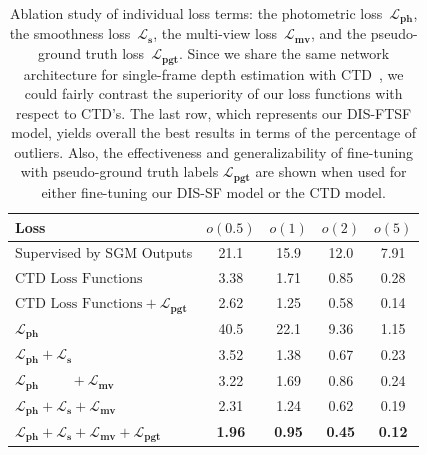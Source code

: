 \begin{table}[t]
    \begin{center}
        \begin{tabular}{lcccc}
        \hline
        Loss & $o(0.5)$ & $o(1)$ & $o(2)$ & $o(5)$\\
        \hline
        Supervised by SGM Outputs & 21.1 & 15.9 & 12.0 & 7.91\\
        $\text{CTD Loss Functions}$ & 3.38 & 1.71 & 0.85 & 0.28\\
        $\text{CTD Loss Functions} + \boldsymbol{\mathcal{L}_{pgt}}$ & 2.62 & 1.25 & 0.58 & 0.14\\        
        $\boldsymbol{\mathcal{L}_{ph}}$ & 40.5 & 22.1 & 9.36 & 1.15\\
        $\boldsymbol{\mathcal{L}_{ph}} + \boldsymbol{\mathcal{L}_s}$ & 3.52 & 1.38 & 0.67 & 0.23\\
        $\boldsymbol{\mathcal{L}_{ph}} \phantom{IILL} + \boldsymbol{\mathcal{L}_{mv}}$ & 3.22 & 1.69 & 0.86 & 0.24\\
        $\boldsymbol{\mathcal{L}_{ph}} + \boldsymbol{\mathcal{L}_s} + \boldsymbol{\mathcal{L}_{mv}}$ & 2.31 & 1.24 & 0.62 & 0.19\\
        $\boldsymbol{\mathcal{L}_{ph}} + \boldsymbol{\mathcal{L}_s} + \boldsymbol{\mathcal{L}_{mv}} + \boldsymbol{\mathcal{L}_{pgt}}$ & \textbf{1.96} & \textbf{0.95} & \textbf{0.45} & \textbf{0.12}\\
        \hline
        \end{tabular}
    \end{center}

    \caption{Ablation study of individual loss terms: the photometric loss~$\boldsymbol{\mathcal{L}_{ph}}$, the smoothness loss~$\boldsymbol{\mathcal{L}_{s}}$, the multi-view loss~$\boldsymbol{\mathcal{L}_{mv}}$, and the pseudo-ground truth loss~$\boldsymbol{\mathcal{L}_{pgt}}$. Since we share the same network architecture for single-frame depth estimation with CTD~\cite{riegler2019connecting},  we could fairly contrast the superiority of our loss functions with respect to CTD's. The last row, which represents our DIS-FTSF model, yields overall the best results in terms of the percentage of outliers. Also, the effectiveness and generalizability of fine-tuning with pseudo-ground truth labels $\boldsymbol{\mathcal{L}_{pgt}}$ are shown when used for either fine-tuning our DIS-SF model or the CTD model.}
    \label{table:ablation_dis_sf_loss}
\end{table}

